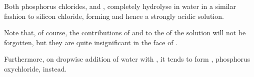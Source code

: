 			Both phosphorus chlorides,  and , completely hydrolyse in water in a similar fashion to silicon chloride,
			forming  and hence a strongly acidic solution.


			Note that, of course, the contributions of  and  to the \pH{} of the solution will not be
			forgotten, but they are quite insignificant in the face of .

			Furthermore, on dropwise addition of water with , it tends to form , phosphorus oxychloride, instead.
























